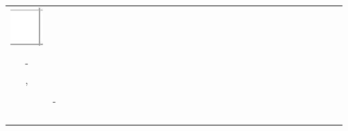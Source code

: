 \documentclass[10pt]{article}
\begin{document}
\begin{center}
\begin{tabular}{|c|c|c|c|c|c|c|c|c|c|c|c|c|c|c|c|c|c|c|c|c|c|c|c|c|c|c|c|c|c|c|}
\hline
 &  &  &  &  &  &  &  &  &  &  &  &  &  &  &  &  &  &  &  &  &  &  &  &  &  &  &  &  &  &  \\
\hline
\includegraphics[max width=\textwidth]{2024_11_21_12a27a32a51fef2c834ag-05(1)}
 &  &  &  &  &  &  &  &  &  &  &  &  &  &  &  &  &  &  &  &  &  &  &  &  &  &  &  &  &  &  \\
\hline
 &  &  &  &  &  &  &  &  &  &  &  &  &  &  &  &  &  &  &  &  &  &  &  &  &  &  &  &  &  &  \\
\hline
- &  &  &  &  &  &  &  &  &  &  &  &  &  &  &  &  &  &  &  &  &  &  &  &  &  &  &  &  &  &  \\
\hline
, &  &  &  &  &  &  &  &  &  &  &  &  &  &  &  &  &  &  &  &  &  &  &  &  &  &  &  &  &  &  \\
\hline
 &  &  &  &  &  &  &  &  &  &  &  &  &  &  &  &  &  &  &  &  &  &  &  &  &  &  &  &  &  &  \\
\hline
 & - &  &  &  &  &  &  &  &  &  &  &  &  &  &  &  &  &  &  &  &  &  &  &  &  &  &  &  &  &  \\
\hline
 &  &  &  &  &  &  &  &  &  &  &  &  &  &  &  &  &  &  &  &  &  &  &  &  &  &  &  &  &  &  \\
\hline
 &  &  &  &  &  &  &  &  &  &  &  &  &  &  &  &  &  &  &  &  &  &  &  &  &  &  &  &  &  &  \\
\hline
 &  &  &  &  &  &  &  &  &  &  &  &  &  &  &  &  &  &  &  &  &  &  &  &  &  &  &  &  &  &  \\
\hline
 &  &  &  &  &  &  &  &  &  &  &  &  &  &  &  &  &  &  &  &  &  &  &  &  &  &  &  &  &  &  \\
\hline
\end{tabular}
\end{center}
\end{document}
